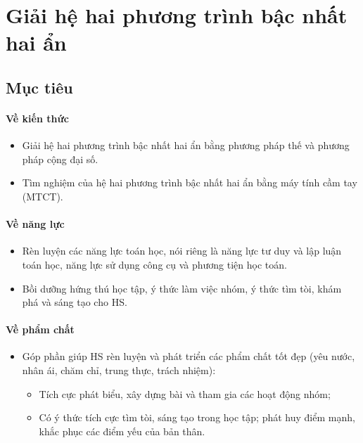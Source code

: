 \section{Giải hệ hai phương trình bậc nhất hai ẩn}

\subsection{Mục tiêu}

\paragraph{Về kiến thức}

\begin{itemize}
    \item Giải hệ hai phương trình bậc nhất hai ẩn bằng phương pháp thế và phương pháp cộng đại số. 
    \item Tìm nghiệm của hệ hai phương trình bậc nhất hai ẩn bằng máy tính cầm tay (MTCT). 
\end{itemize}

\paragraph{Về năng lực}

\begin{itemize}
    \item Rèn luyện các năng lực toán học, nói riêng là năng lực tư duy và lập luận toán học, năng lực sử dụng công cụ và phương tiện học toán. 
    \item Bồi dưỡng hứng thú học tập, ý thức làm việc nhóm, ý thức tìm tòi, khám phá và sáng tạo cho HS. 
\end{itemize}

\paragraph{Về phẩm chất}

\begin{itemize}
    \item Góp phần giúp HS rèn luyện và phát triển các phẩm chất tốt đẹp (yêu nước, nhân ái, chăm chỉ, trung thực, trách nhiệm):
    \begin{itemize}
        \item Tích cực phát biểu, xây dựng bài và tham gia các hoạt động nhóm;
        \item Có ý thức tích cực tìm tòi, sáng tạo trong học tập; phát huy điểm mạnh, khắc phục các điểm yếu của bản thân. 
    \end{itemize}
\end{itemize}

